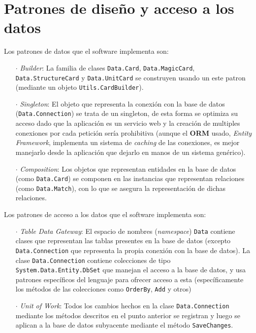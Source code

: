 \section*{Patrones de diseño y acceso a los datos}

Los patrones de datos que el software implementa son:

\begin{enumerate}
  \item[\(\cdot\)] \textit{Builder}: La familia de clases \lstinline|Data.Card|, \lstinline|Data.MagicCard|, \lstinline|Data.StructureCard| y \lstinline|Data.UnitCard| se construyen usando un este patron (mediante un objeto \lstinline|Utils.CardBuilder|).
  \item[\(\cdot\)] \textit{Singleton}: El objeto que representa la conexión con la base de datos (\lstinline|Data.Connection|) se trata de un singleton, de esta forma se optimiza su acceso dado que la aplicación es un servicio web y la creación de multiples conexiones por cada petición sería prohibitiva (aunque el \textbf{ORM} usado, \textit{Entity Framework}, implementa un sistema de \textit{caching} de las conexiones, es mejor manejarlo desde la aplicación que dejarlo en manos de un sistema genérico).
  \item[\(\cdot\)] \textit{Composition}: Los objetos que representan entidades en la base de datos (como \lstinline|Data.Card|) se componen en las instancias que representan relaciones (como \lstinline|Data.Match|), con lo que se asegura la representación de dichas relaciones.
\end{enumerate}

Los patrones de acceso a los datos que el software implementa son:

\begin{enumerate}
  \item[\(\cdot\)] \textit{Table Data Gateway}: El espacio de nombres (\textit{namespace}) \lstinline|Data| contiene clases que representan las tablas presentes en la base de datos (excepto \lstinline|Data.Connection| que representa la propia conexión con la base de datos). La clase \lstinline|Data.Connection| contiene colecciones de tipo \lstinline|System.Data.Entity.DbSet| que manejan el acceso a la base de datos, y usa patrones específicos del lenguaje para ofrecer acceso a esta (específicamente los métodos de las colecciones como \lstinline|OrderBy|, \lstinline|Add| y otros)
  \item[\(\cdot\)] \textit{Unit of Work}: Todos los cambios hechos en la clase \lstinline|Data.Connection| mediante los métodos descritos en el punto anterior se registran y luego se aplican a la base de datos subyacente mediante el método \lstinline|SaveChanges|. 
\end{enumerate}
